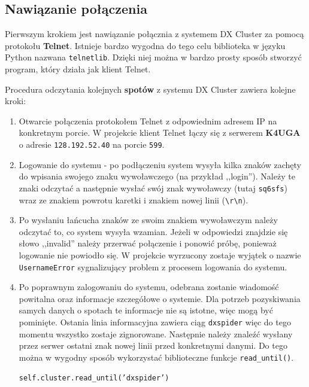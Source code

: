 \documentclass[]{mgr}
\begin{document}
            \subsection{Nawiązanie połączenia}
            Pierwszym krokiem jest nawiązanie połącznia z systemem DX Cluster za pomocą protokołu \textbf{Telnet}. Istnieje bardzo wygodna do tego celu biblioteka w języku Python nazwana \texttt{telnetlib}. Dzięki niej można w bardzo prosty sposób stworzyć program, który działa jak klient Telnet.

            Procedura odczytania kolejnych \textbf{spotów} z systemu DX Cluster zawiera kolejne kroki:
            \begin{enumerate}
                \item Otwarcie połączenia protokołem Telnet z odpowiednim adresem IP na konkretnym porcie. W projekcie klient Telnet łączy się z serwerem \textbf{K4UGA} o adresie \texttt{128.192.52.40} na porcie \texttt{599}.
                \item Logowanie do systemu - po podłączeniu system wysyła kilka znaków zachęty do wpisania swojego znaku wywoławczego (na przykład ,,login''). Należy te znaki odczytać a następnie wysłać swój znak wywoławczy (tutaj \texttt{sq6sfs}) wraz ze znakiem powrotu karetki i znakiem nowej linii (\texttt{\textbackslash{}r\textbackslash{}n}).
                \item Po wysłaniu łańcucha znaków ze swoim znakiem wywoławczym należy odczytać to, co system wysyła wzamian. Jeżeli w odpowiedzi znajdzie się słowo ,,invalid'' należy przerwać połączenie i ponowić próbę, ponieważ logowanie nie powiodło się. W projekcie wyrzucony zostaje wyjątek o nazwie \texttt{UsernameError} sygnalizujący problem z procesem logowania do systemu.
                \item Po poprawnym zalogowaniu do systemu, odebrana zostanie wiadomość powitalna oraz informacje szczegółowe o systemie. Dla potrzeb pozyskiwania samych danych o spotach te informacje nie są istotne, więc mogą być pominięte. Ostania linia informacyjna zawiera ciąg \texttt{dxspider} więc do tego momentu wszystko zostaje zignorowane. Następnie należy znaleźć wysłany przez serwer ostatni znak nowej linii przed konkretnymi danymi. Do tego można w wygodny sposób wykorzystać biblioteczne funkcje \texttt{read\_until()}.

                \texttt{self.cluster.read\_until('dxspider')}


\end{enumerate}
\end{document}
